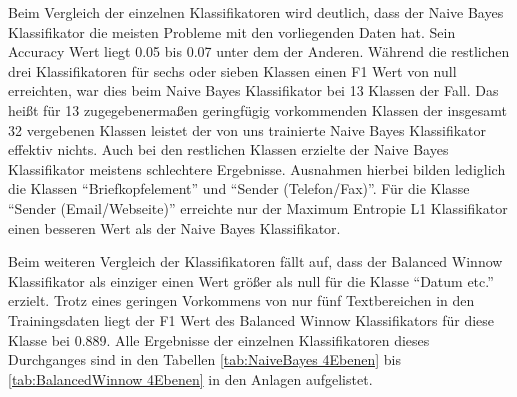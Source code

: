 
Beim Vergleich der einzelnen Klassifikatoren wird deutlich, dass der Naive Bayes Klassifikator die meisten Probleme mit den vorliegenden Daten hat. Sein Accuracy Wert liegt 0.05 bis 0.07 unter dem der Anderen. Während die restlichen drei Klassifikatoren für sechs oder sieben Klassen einen F1 Wert von null erreichten, war dies beim Naive Bayes Klassifikator bei 13 Klassen der Fall. Das heißt für 13 zugegebenermaßen geringfügig vorkommenden Klassen der insgesamt 32 vergebenen Klassen leistet der von uns trainierte Naive Bayes Klassifikator effektiv nichts. Auch bei den restlichen Klassen erzielte der Naive Bayes Klassifikator meistens schlechtere Ergebnisse. Ausnahmen hierbei bilden lediglich die Klassen "`Briefkopfelement"' und "`Sender (Telefon/Fax)"'. Für die Klasse "`Sender (Email/Webseite)"' erreichte nur der Maximum Entropie L1 Klassifikator einen besseren Wert als der Naive Bayes Klassifikator. 

Beim weiteren Vergleich der Klassifikatoren fällt auf, dass der Balanced Winnow Klassifikator als einziger einen Wert größer als null für die Klasse "`Datum etc."' erzielt. Trotz eines geringen Vorkommens von nur fünf Textbereichen in den Trainingsdaten liegt der F1 Wert des Balanced Winnow Klassifikators für diese Klasse bei 0.889. Alle Ergebnisse der einzelnen Klassifikatoren dieses Durchganges sind in den Tabellen \ref{tab:NaiveBayes 4Ebenen} bis \ref{tab:BalancedWinnow 4Ebenen} in den Anlagen aufgelistet.

